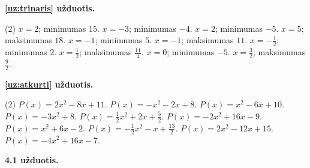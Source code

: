 \documentclass[11pt,a4paper]{scrartcl}
\numberwithin{exercise}{section}
\begin{document}
\medskip
\noindent\textbf{\ref{uz:trinaris} užduotis.}

\begin{tasks}[label=(\arabic*),label-width=2em](2)
\task $x=2$; minimumas $15$.
\task $x=-3$; minimumas $-4$.
\task $x=2$; minimumas $-5$.
\task $x=5$; maksimumas $18$.
\task $x=-1$; minimumas $5$.
\task $x=-1$; maksimumas $11$.
\task $x=-\frac12$; minimumas $2$.
\task $x=\frac12$; maksimumas $\frac{11}{4}$.
\task $x=0$; minimumas $-5$.
\task $x=\frac32$; maksimumas $\frac92$.
\end{tasks}

\medskip
\noindent\textbf{\ref{uz:atkurti} užduotis.}

\begin{tasks}[label=(\arabic*),label-width=2em](2)
\task $P(x)=2x^2-8x+11$.
\task $P(x)=-x^2-2x+8$.
\task $P(x)=x^2-6x+10$.
\task $P(x)=-3x^2+8$.
\task $P(x)=\frac12x^2+2x+\frac52$.
\task $P(x)=-2x^2+16x-9$.
\task $P(x)=x^2+6x-2$.
\task $P(x)=-\frac12x^2-x+\frac{13}{2}$.
\task $P(x)=2x^2-12x+15$.
\task $P(x)=-4x^2+16x-7$.
\end{tasks}

\medskip
\noindent\textbf{4.1 užduotis.}
\end{document}
